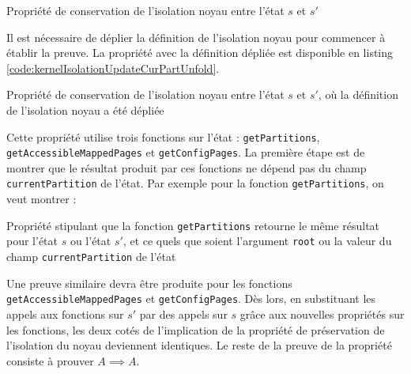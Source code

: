 			\begin{listing}[!ht]
				\caption{Propriété de conservation de l'isolation noyau entre l'état $s$ et $s'$}
				\label{code:kernelIsolationUpdateCurPart}
			\end{listing}
			\label{sec:curPartKernelIsolation}

			Il est nécessaire de déplier la définition de l'isolation noyau pour commencer à établir la preuve. La propriété avec la définition dépliée est disponible en listing \ref{code:kernelIsolationUpdateCurPartUnfold}.

			\begin{listing}[!ht]
				\caption{Propriété de conservation de l'isolation noyau entre l'état $s$ et $s'$, où la définition de l'isolation noyau a été dépliée}
				\label{code:kernelIsolationUpdateCurPartUnfold}
			\end{listing}

			Cette propriété utilise trois fonctions sur l'état : \texttt{getPartitions}, \texttt{getAccessibleMappedPages} et \texttt{getConfigPages}. La première étape est de montrer que le résultat produit par ces fonctions ne dépend pas du champ \texttt{currentPartition} de l'état. Par exemple pour la fonction \texttt{getPartitions}, on veut montrer :

			\begin{listing}[!ht]
				\caption{Propriété stipulant que la fonction \texttt{getPartitions} retourne le même résultat pour l'état $s$ ou l'état $s'$, et ce quels que soient l'argument \texttt{root} ou la valeur du champ \texttt{currentPartition} de l'état}
				\label{code:partitionTreeRemains}
			\end{listing}

			Une preuve similaire devra être produite pour les fonctions \texttt{getAccessibleMappedPages} et \texttt{getConfigPages}. Dès lors, en substituant les appels aux fonctions sur $s'$ par des appels sur $s$ grâce aux nouvelles propriétés sur les fonctions, les deux cotés de l'implication de la propriété de préservation de l'isolation du noyau deviennent identiques. Le reste de la preuve de la propriété consiste à prouver $A \implies A$.\\

